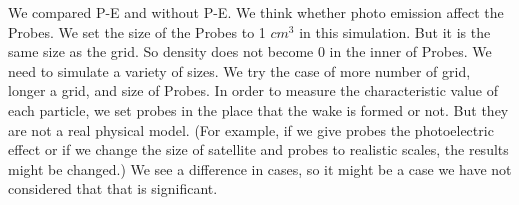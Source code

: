 

We compared P-E and without P-E. We think whether photo emission affect the Probes.
We set the size of the Probes to 1 $cm^3$ in this simulation. But it is the same size as the grid.
So density does not become 0 in the inner of Probes. We need to simulate a variety of sizes.
We try the case of more number of grid, longer a grid, and size of Probes.
In order to measure the characteristic value of each particle, we set probes in the
place that the wake is formed or not. But they are not a real physical model.
(For example, if we give probes the photoelectric effect or if we change the size
of satellite and probes to realistic scales, the results might be changed.)
We see a difference in cases, so it might be a case we have not considered that that is significant.
